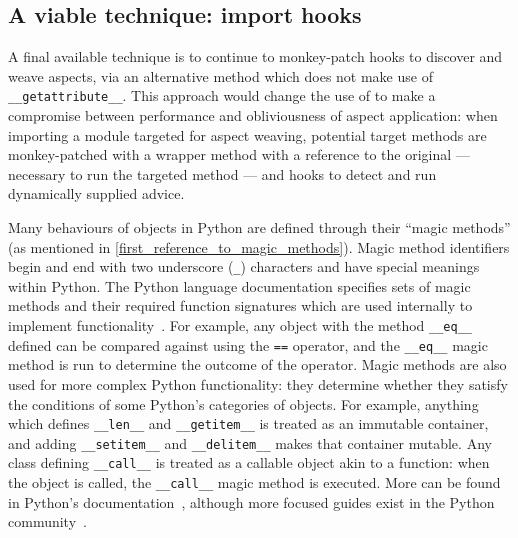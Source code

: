 \subsection{A viable technique: import hooks}\label{subsec:pdsf3importhookdiscussion}

A final available technique is to continue to monkey-patch hooks to discover and
weave aspects, via an alternative method which does not make use of
\lstinline{__getattribute__}. This approach would change the use of \pdsf{} to
make a compromise between performance and obliviousness of aspect application:
when importing a module targeted for aspect weaving, potential target methods
are monkey-patched with a wrapper method with a reference to the original ---
necessary to run the targeted method --- and hooks to detect and run dynamically
supplied advice.

Many behaviours of objects in Python are defined through their ``magic
methods'' (as mentioned in \cref{first_reference_to_magic_methods}). Magic method
identifiers begin and end with two underscore (\lstinline{_}) characters and
have special meanings within Python. The Python language documentation specifies
sets of magic methods and their required function signatures which are used
internally to implement functionality~\cite{py3docs}. For example, any object
with the method \lstinline{__eq__} defined can be compared against using the
\lstinline{==} operator, and the \lstinline{__eq__} magic method is run to
determine the outcome of the operator. Magic methods are also used for more
complex Python functionality: they determine whether they satisfy the conditions
of some Python's categories of objects. For example, anything which defines
\lstinline{__len__} and \lstinline{__getitem__} is treated as an immutable
container, and adding \lstinline{__setitem__} and \lstinline{__delitem__} makes
that container mutable. Any class defining \lstinline{__call__} is treated as a
callable object akin to a function: when the object is called, the
\lstinline{__call__} magic method is executed. More can be found in Python's
documentation~\cite{py3docs}, although more focused guides exist in the Python
community~\cite{magicmethodguide}.

